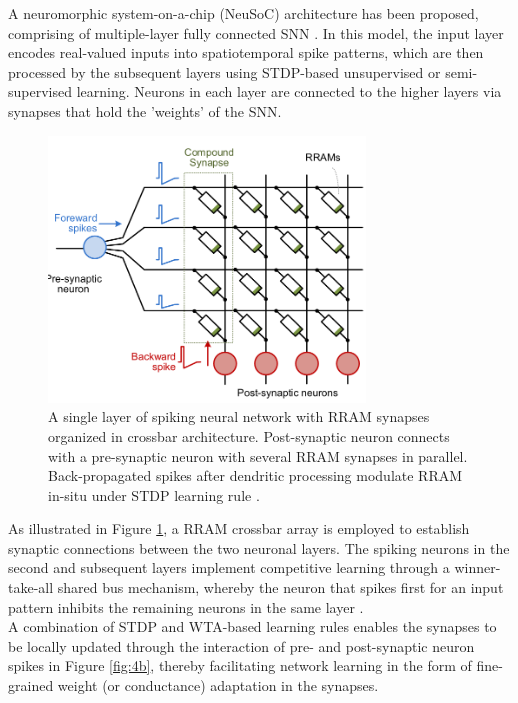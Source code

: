 \noindent A neuromorphic system-on-a-chip (NeuSoC) architecture has been proposed, comprising of multiple-layer fully connected SNN \cite{kheradpisheh2018stdp}. In this model, the input layer encodes real-valued inputs into spatiotemporal spike patterns, which are then processed by the subsequent layers using STDP-based unsupervised or semi-supervised learning. Neurons in each layer are connected to the higher layers via synapses that hold the 'weights' of the SNN.\\

\begin{figure}[htbp!] 
\centering    
\includegraphics[width=0.75\textwidth]{Chapter4/Figs/4c.png}
\caption[A single layer of spiking neural network with RRAM synapses organized in crossbar architecture.]{A single layer of spiking neural network with RRAM synapses organized in crossbar architecture. Post-synaptic neuron connects with a pre-synaptic neuron with several RRAM synapses in parallel. Back-propagated spikes after dendritic processing modulate RRAM in-situ under STDP learning rule \cite{wu2018dendritic}.}
\label{fig:4c}
\end{figure}

\noindent As illustrated in Figure \ref{fig:4c}, a RRAM crossbar array is employed to establish synaptic connections between the two neuronal layers. The spiking neurons in the second and subsequent layers implement competitive learning through a winner-take-all shared bus mechanism, whereby the neuron that spikes first for an input pattern inhibits the remaining neurons in the same layer \cite{markram2012spike}.\\

\noindent A combination of STDP and WTA-based learning rules enables the synapses to be locally updated through the interaction of pre- and post-synaptic neuron spikes in Figure \ref{fig:4b}, thereby facilitating network learning in the form of fine-grained weight (or conductance) adaptation in the synapses. \\

